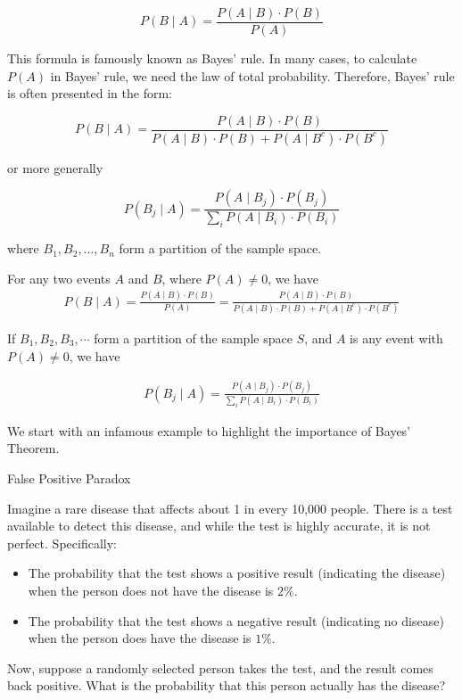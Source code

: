 \[
P(B \mid A) = \frac{P(A \mid B) \cdot P(B)}{P(A)}
\]

This formula is famously known as Bayes' rule. In many cases, to calculate \( P(A) \) in Bayes' rule, we need the law of total probability. Therefore, Bayes' rule is often presented in the form:

\[
P(B \mid A) = \frac{P(A \mid B) \cdot P(B)}{P(A \mid B) \cdot P(B) + P(A \mid B^c) \cdot P(B^c)}
\]

or more generally

\[
P\left(B_j \mid A\right) = \frac{P\left(A \mid B_j\right) \cdot P\left(B_j\right)}{\sum_i P\left(A \mid B_i\right) \cdot P\left(B_i\right)}
\]

where \( B_1, B_2, \ldots, B_n \) form a partition of the sample space.

\begin{theorem}
    For any two events $A$ and $B$, where $P(A) \neq 0$, we have
    \begin{align*}
    P(B \mid A) = \frac{P(A \mid B) \cdot P(B)}{P(A)}
     = \frac{P(A \mid B) \cdot P(B)}{P(A \mid B) \cdot P(B) + P(A \mid B^c) \cdot P(B^c)}
    \end{align*}

    If $B_1, B_2, B_3, \cdots$ form a partition of the sample space $S$, and $A$ is any event with $P(A) \neq 0$, we have

    \begin{align*}
    P\left(B_j \mid A\right) = \frac{P\left(A \mid B_j\right) \cdot P\left(B_j\right)}{\sum_i P\left(A \mid B_i\right) \cdot P\left(B_i\right)}
    \end{align*}
\end{theorem}

We start with an infamous example to highlight the importance of Bayes' Theorem.

\begin{example} False Positive Paradox

   Imagine a rare disease that affects about 1 in every 10,000 people. There is a test available to detect this disease, and while the test is highly accurate, it is not perfect. Specifically:
\begin{itemize}
    \item The probability that the test shows a positive result (indicating the disease) when the person does not have the disease is $2 \%$.
    \item The probability that the test shows a negative result (indicating no disease) when the person does have the disease is $1 \%$.
\end{itemize}

Now, suppose a randomly selected person takes the test, and the result comes back positive. What is the probability that this person actually has the disease?
\end{example}

